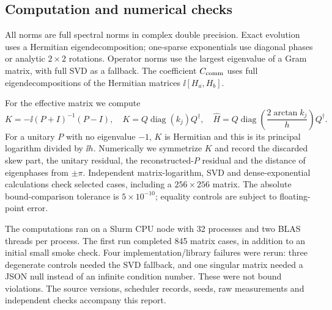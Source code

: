 \subsection{Computation and numerical checks}
All norms are full spectral norms in complex double precision. Exact evolution uses a Hermitian eigendecomposition; one-sparse exponentials use diagonal phases or analytic $2\times2$ rotations. Operator norms use the largest eigenvalue of a Gram matrix, with full SVD as a fallback. The coefficient $C_{\mathrm{comm}}$ uses full eigendecompositions of the Hermitian matrices $\ii[H_a,H_b]$.

For the effective matrix we compute
\begin{equation}
 K=-\ii(P+I)^{-1}(P-I),\quad
 K=Q\operatorname{diag}(k_j)Q^\dagger,\quad
 \widehat H=Q\operatorname{diag}\!\left(\frac{2\arctan k_j}{h}\right)Q^\dagger.
\end{equation}
For a unitary $P$ with no eigenvalue $-1$, $K$ is Hermitian and this is its principal logarithm divided by $\ii h$. Numerically we symmetrize $K$ and record the discarded skew part, the unitary residual, the reconstructed-$P$ residual and the distance of eigenphases from $\pm\pi$. Independent matrix-logarithm, SVD and dense-exponential calculations check selected cases, including a $256\times256$ matrix. The absolute bound-comparison tolerance is $5\times10^{-10}$; equality controls are subject to floating-point error.

The computations ran on a Slurm CPU node with 32 processes and two BLAS threads per process. The first run completed 845 matrix cases, in addition to an initial small smoke check. Four implementation/library failures were rerun: three degenerate controls needed the SVD fallback, and one singular matrix needed a JSON null instead of an infinite condition number. These were not bound violations. The source versions, scheduler records, seeds, raw measurements and independent checks accompany this report.



